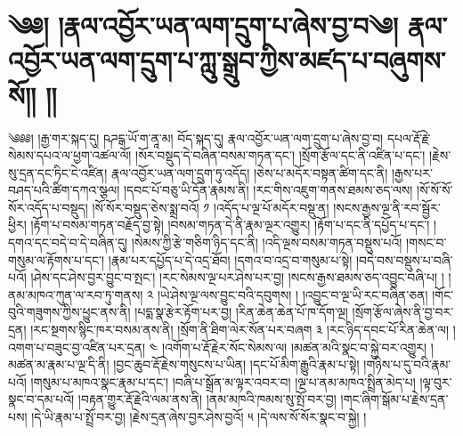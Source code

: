 \setcounter{footnote}{0} 
\chapter{༄༅། །རྣལ་འབྱོར་ཡན་ལག་དྲུག་པ་ཞེས་བྱ་བ༄། རྣལ་འབྱོར་ཡན་ལག་དྲུག་པ་ཀླུ་སྒྲུབ་ཀྱིས་མཛད་པ་བཞུགས་སོ།། །།}༄༅༅། །རྒྱ་གར་སྐད་དུ། ཥཌངྒ་ཡོ་ག་ནཱ་མ། བོད་སྐད་དུ། རྣལ་འབྱོར་ཡན་ལག་དྲུག་པ་ཞེས་བྱ་བ། དཔལ་རྡོ་རྗེ་སེམས་དཔའ་ལ་ཕྱག་འཚལ་ལོ། །སོར་བསྡུད་དེ་བཞིན་བསམ་གཏན་དང་། །སྲོག་རྩོལ་དང་ནི་འཛིན་པ་དང་། །རྗེས་སུ་དྲན་དང་ཏིང་ངེ་འཛིན། རྣལ་འབྱོར་ཡན་ལག་དྲུག་ཏུ་འདོད། །ཅེས་པ་མདོར་བསྟན་ཚིག་དང་ནི། །རྒྱས་པར་བཤད་པའི་ཚིག་དཀའ་སྩལ། །དབང་པོ་བཅུ་ཡི་དོན་རྣམས་ནི། །རང་གིས་འཇུག་གནས་ཐམས་ཅད་ལས། །སོ་སོ་སོ་སོར་འདོད་པ་བསྡུད། །སོ་སོར་བསྡུད་ཅེས་སྨྲ་བའོ། ༡ །འདོད་པ་ལྔ་པོ་མདོར་བསྡུ་ན། །སངས་རྒྱས་ལྔ་ནི་རབ་སྦྱོར་ཕྱིར། །རྟོག་པ་བསམ་གཏན་བརྗོད་བྱ་སྟེ། །བསམ་གཏན་དེ་ནི་རྣམ་ལྔར་འགྱུར། །རྟོག་པ་དང་ནི་དཔྱོད་པ་དང་། །དགའ་དང་བདེ་བ་དེ་བཞིན་དུ། །སེམས་ཀྱི་རྩེ་གཅིག་ཉིད་དང་ནི། །འདི་ལྔས་བསམ་གཏན་བསྡུས་པའོ། །གསང་བ་གསུམ་ལ་རྟོགས་པ་དང་། །རྣམ་པར་དཔྱོད་པ་དེ་འདྲ་ཐོབ། །དགའ་བ་འདྲ་བ་གསུམ་པ་སྟེ། །བདེ་བས་བསྡུས་པ་བཞི་པའོ། །ཤེས་དང་ཤེས་བྱར་བྱུང་བ་སྤང་། །རང་སེམས་ལྔ་པར་ཤེས་པར་བྱ། །སངས་རྒྱས་ཐམས་ཅད་འབྱུང་བཞི་པ། ། །ནམ་མཁའ་ཀུན་ལ་རབ་ཏུ་གནས། ༢ །ཡེ་ཤེས་ལྔ་ལས་བྱུང་བའི་དབུགས། ། །འབྱུང་བ་ལྔ་ཡི་རང་བཞིན་ཅན། །གོང་བུའི་གཟུགས་ཀྱིས་ཕྱུང་ནས་ནི། །པདྨ་སྣ་རྩེར་རྟོག་པར་བྱ། །རིན་ཆེན་ཆེན་པོ་ཁ་དོག་ལྔ། །སྲོག་རྩོལ་ཞེས་ནི་བྱ་བར་དྲན། །རང་སྔགས་སྙིང་ཁར་བསམ་ནས་ནི། །སྲོག་ནི་ཐིག་ལེར་སོན་པར་བཞག ༣ །རང་ཉིད་དབང་པོ་རིན་ཆེན་ལ། །འགག་པ་བཟུང་བྱ་འཛིན་པར་དྲན། ༤ །འགོག་པ་རྡོ་རྗེར་སོང་སེམས་ལ། །མཚན་མའི་སྣང་བ་སྐྱེ་བར་འགྱུར། །མཚན་མ་རྣམ་པ་ལྔ་དི་ནི། །བྱང་ཆུབ་རྡོ་རྗེས་གསུངས་པ་ཡིན། །དང་པོ་མིག་རྒྱུའི་རྣམ་པ་སྟེ། །གཉིས་པ་དུ་བའི་རྣམ་པའོ། །གསུམ་པ་མཁའ་སྣང་རྣམ་པ་དང་། །བཞི་པ་སྒྲོན་མ་ལྟར་འབར་བ། །ལྔ་པ་ནམ་མཁའ་སྤྲིན་མེད་པ། །ལྟ་བུར་སྣང་བ་དམ་པའོ། །བརྟན་གྱུར་རྡོ་རྗེའི་ལམ་ནས་ནི། །ནམ་མཁའི་ཁམས་སུ་སྤོ་བར་བྱ། །གང་ཞིག་སྒོམ་པ་རྗེས་དྲན་པས། །དེ་ཡི་རྣམ་པ་སྤྲོ་བར་བྱ། །རྗེས་དྲན་ཞེས་བྱར་ཤེས་བྱའོ། ༥ །དེ་ལས་སོ་སོར་སྣང་བ་སྐྱེ། །
